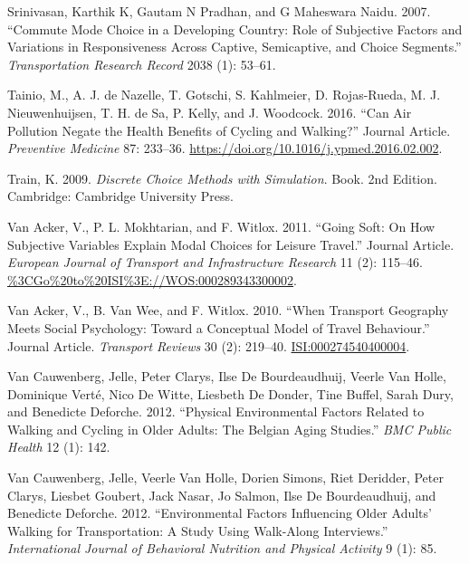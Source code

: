 \documentclass[]{elsarticle} %
\begin{document}
\leavevmode\hypertarget{ref-srinivasan2007commute}{}%
Srinivasan, Karthik K, Gautam N Pradhan, and G Maheswara Naidu. 2007.
``Commute Mode Choice in a Developing Country: Role of Subjective
Factors and Variations in Responsiveness Across Captive, Semicaptive,
and Choice Segments.'' \emph{Transportation Research Record} 2038 (1):
53--61.

\leavevmode\hypertarget{ref-Tainio2016air}{}%
Tainio, M., A. J. de Nazelle, T. Gotschi, S. Kahlmeier, D. Rojas-Rueda,
M. J. Nieuwenhuijsen, T. H. de Sa, P. Kelly, and J. Woodcock. 2016.
``Can Air Pollution Negate the Health Benefits of Cycling and Walking?''
Journal Article. \emph{Preventive Medicine} 87: 233--36.
\url{https://doi.org/10.1016/j.ypmed.2016.02.002}.

\leavevmode\hypertarget{ref-Train2009discrete}{}%
Train, K. 2009. \emph{Discrete Choice Methods with Simulation}. Book.
2nd Edition. Cambridge: Cambridge University Press.

\leavevmode\hypertarget{ref-vanAcker2011going}{}%
Van Acker, V., P. L. Mokhtarian, and F. Witlox. 2011. ``Going Soft: On
How Subjective Variables Explain Modal Choices for Leisure Travel.''
Journal Article. \emph{European Journal of Transport and Infrastructure
Research} 11 (2): 115--46.
\url{\%3CGo\%20to\%20ISI\%3E://WOS:000289343300002}.

\leavevmode\hypertarget{ref-vanAcker2010transport}{}%
Van Acker, V., B. Van Wee, and F. Witlox. 2010. ``When Transport
Geography Meets Social Psychology: Toward a Conceptual Model of Travel
Behaviour.'' Journal Article. \emph{Transport Reviews} 30 (2): 219--40.
\url{ISI:000274540400004}.

\leavevmode\hypertarget{ref-van2012physical}{}%
Van Cauwenberg, Jelle, Peter Clarys, Ilse De Bourdeaudhuij, Veerle Van
Holle, Dominique Verté, Nico De Witte, Liesbeth De Donder, Tine Buffel,
Sarah Dury, and Benedicte Deforche. 2012. ``Physical Environmental
Factors Related to Walking and Cycling in Older Adults: The Belgian
Aging Studies.'' \emph{BMC Public Health} 12 (1): 142.

\leavevmode\hypertarget{ref-van2012environmental}{}%
Van Cauwenberg, Jelle, Veerle Van Holle, Dorien Simons, Riet Deridder,
Peter Clarys, Liesbet Goubert, Jack Nasar, Jo Salmon, Ilse De
Bourdeaudhuij, and Benedicte Deforche. 2012. ``Environmental Factors
Influencing Older Adults' Walking for Transportation: A Study Using
Walk-Along Interviews.'' \emph{International Journal of Behavioral
Nutrition and Physical Activity} 9 (1): 85.
\end{document}
